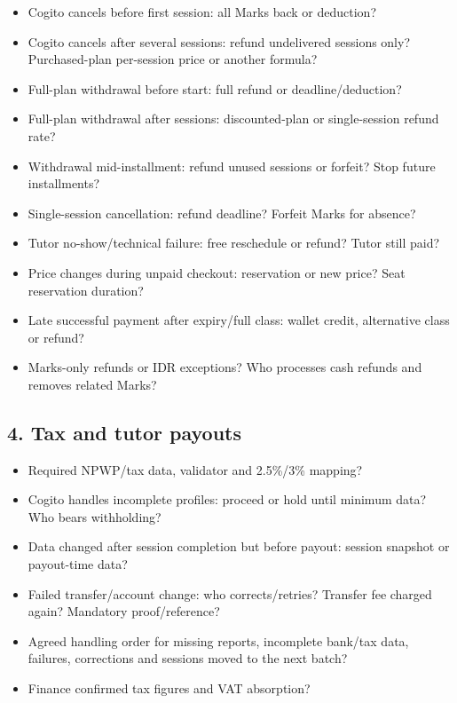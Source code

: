 \documentclass[11pt,a4paper]{article}
\begin{document}
\begin{itemize}
\item Cogito cancels before first session: all Marks back or deduction?
\item Cogito cancels after several sessions: refund undelivered sessions only? Purchased-plan per-session price or another formula?
\item Full-plan withdrawal before start: full refund or deadline/\allowbreak{}deduction?
\item Full-plan withdrawal after sessions: discounted-plan or single-session refund rate?
\item Withdrawal mid-installment: refund unused sessions or forfeit? Stop future installments?
\item Single-session cancellation: refund deadline? Forfeit Marks for absence?
\item Tutor no-show/\allowbreak{}technical failure: free reschedule or refund? Tutor still paid?
\item Price changes during unpaid checkout: reservation or new price? Seat reservation duration?
\item Late successful payment after expiry/\allowbreak{}full class: wallet credit, alternative class or refund?
\item Marks-only refunds or IDR exceptions? Who processes cash refunds and removes related Marks?
\end{itemize}

\subsection*{4. Tax and tutor payouts}

\begin{itemize}
\item Required NPWP/\allowbreak{}tax data, validator and 2.5\%/\allowbreak{}3\% mapping?
\item Cogito handles incomplete profiles: proceed or hold until minimum data? Who bears withholding?
\item Data changed after session completion but before payout: session snapshot or payout-time data?
\item Failed transfer/\allowbreak{}account change: who corrects/\allowbreak{}retries? Transfer fee charged again? Mandatory proof/\allowbreak{}reference?
\item Agreed handling order for missing reports, incomplete bank/\allowbreak{}tax data, failures, corrections and sessions moved to the next batch?
\item Finance confirmed tax figures and VAT absorption?
\end{itemize}
\end{document}
